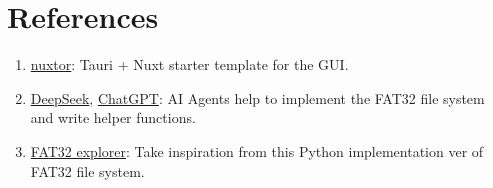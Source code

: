 \documentclass[a4paper,12pt]{report}
\begin{document}
\pagebreak
\section{References}
\begin{enumerate}
    \item \href{https://github.com/NicolaSpadari/nuxtor}{nuxtor}: Tauri + Nuxt starter template for the GUI\@.
    \item \href{https://www.deepseek.com/}{DeepSeek}, \href{https://chatgpt.com/}{ChatGPT}: AI Agents help to implement the FAT32 file system and write helper functions.
    \item \href{https://github.com/PSDat123/FAT32-and-NTFS-explorer/blob/master/FAT32.py}{FAT32 explorer}: Take inspiration from this Python implementation ver of FAT32 file system.
\end{enumerate}
\end{document}
